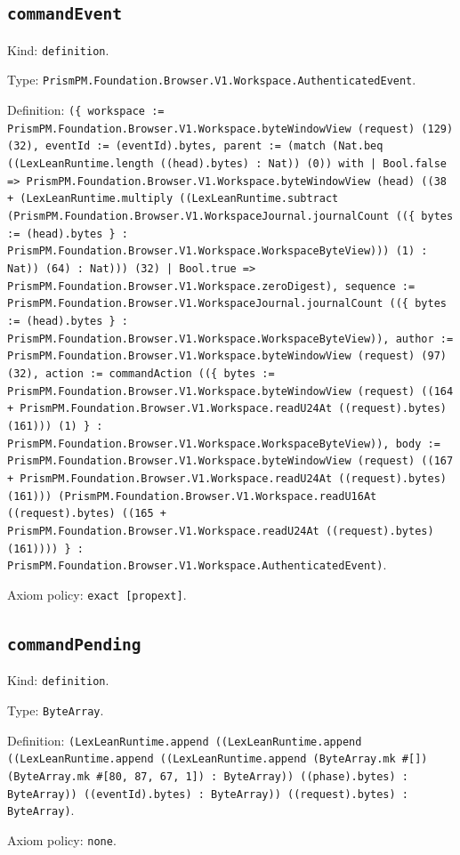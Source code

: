 \documentclass[11pt]{article}
\begin{document}
\subsection*{\texttt{commandEvent}}
\noindent Kind: \texttt{definition}.\par
\noindent Type: \texttt{PrismPM.Foundation.Browser.V1.Workspace.AuthenticatedEvent}.\par
\noindent Definition: \texttt{(\{ workspace := PrismPM.Foundation.Browser.V1.Workspace.byteWindowView (request) (129) (32), eventId := (eventId).bytes, parent := (match (Nat.beq ((LexLeanRuntime.length ((head).bytes) : Nat)) (0)) with | Bool.false => PrismPM.Foundation.Browser.V1.Workspace.byteWindowView (head) ((38 + (LexLeanRuntime.multiply ((LexLeanRuntime.subtract (PrismPM.Foundation.Browser.V1.WorkspaceJournal.journalCount ((\{ bytes := (head).bytes \} : PrismPM.Foundation.Browser.V1.Workspace.WorkspaceByteView))) (1) : Nat)) (64) : Nat))) (32) | Bool.true => PrismPM.Foundation.Browser.V1.Workspace.zeroDigest), sequence := PrismPM.Foundation.Browser.V1.WorkspaceJournal.journalCount ((\{ bytes := (head).bytes \} : PrismPM.Foundation.Browser.V1.Workspace.WorkspaceByteView)), author := PrismPM.Foundation.Browser.V1.Workspace.byteWindowView (request) (97) (32), action := commandAction ((\{ bytes := PrismPM.Foundation.Browser.V1.Workspace.byteWindowView (request) ((164 + PrismPM.Foundation.Browser.V1.Workspace.readU24At ((request).bytes) (161))) (1) \} : PrismPM.Foundation.Browser.V1.Workspace.WorkspaceByteView)), body := PrismPM.Foundation.Browser.V1.Workspace.byteWindowView (request) ((167 + PrismPM.Foundation.Browser.V1.Workspace.readU24At ((request).bytes) (161))) (PrismPM.Foundation.Browser.V1.Workspace.readU16At ((request).bytes) ((165 + PrismPM.Foundation.Browser.V1.Workspace.readU24At ((request).bytes) (161)))) \} : PrismPM.Foundation.Browser.V1.Workspace.AuthenticatedEvent)}.\par
\noindent Axiom policy: \texttt{exact [propext]}.\par
\subsection*{\texttt{commandPending}}
\noindent Kind: \texttt{definition}.\par
\noindent Type: \texttt{ByteArray}.\par
\noindent Definition: \texttt{(LexLeanRuntime.append ((LexLeanRuntime.append ((LexLeanRuntime.append ((LexLeanRuntime.append (ByteArray.mk \#[]) (ByteArray.mk \#[80, 87, 67, 1]) : ByteArray)) ((phase).bytes) : ByteArray)) ((eventId).bytes) : ByteArray)) ((request).bytes) : ByteArray)}.\par
\noindent Axiom policy: \texttt{none}.\par
\end{document}

